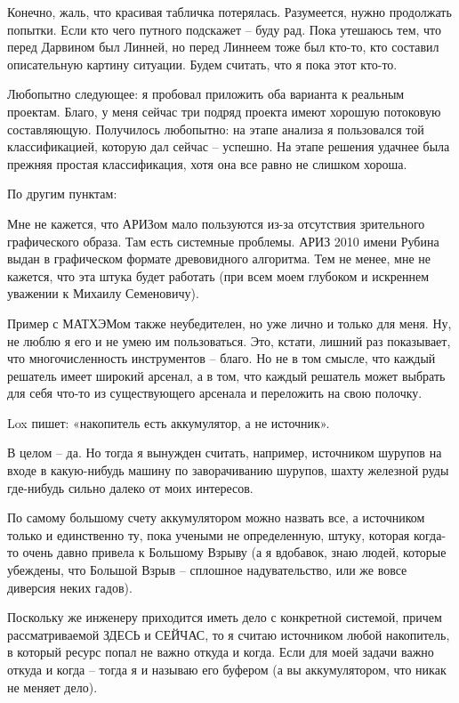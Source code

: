 \documentclass[a4paper,11pt]{article}
\begin{document}
Конечно, жаль, что красивая табличка потерялась. Разумеется, нужно продолжать
попытки. Если кто чего путного подскажет – буду рад. Пока утешаюсь тем, что
перед Дарвином был Линней, но перед Линнеем тоже был кто-то, кто составил
описательную картину ситуации. Будем считать, что я пока этот кто-то.

Любопытно следующее: я пробовал приложить оба варианта к реальным проектам.
Благо, у меня сейчас три подряд проекта имеют хорошую потоковую составляющую.
Получилось любопытно: на этапе анализа я пользовался той классификацией,
которую дал сейчас – успешно. На этапе решения удачнее была прежняя простая
классификация, хотя она все равно не слишком хороша.

По другим пунктам:

Мне не кажется, что АРИЗом мало пользуются из-за отсутствия зрительного
графического образа. Там есть системные проблемы. АРИЗ 2010 имени Рубина выдан
в графическом формате древовидного алгоритма. Тем не менее, мне не кажется,
что эта штука будет работать (при всем моем глубоком и искреннем уважении к
Михаилу Семеновичу).

Пример с МАТХЭМом также неубедителен, но уже лично и только для меня. Ну, не
люблю я его и не умею им пользоваться. Это, кстати, лишний раз показывает, что
многочисленность инструментов – благо. Но не в том смысле, что каждый решатель
имеет широкий арсенал, а в том, что каждый решатель может выбрать для себя
что-то из существующего арсенала и переложить на свою полочку.

Lox пишет: «накопитель есть аккумулятор, а не источник».

В целом – да. Но тогда я вынужден считать, например, источником шурупов на
входе в какую-нибудь машину по заворачиванию шурупов, шахту железной руды
где-нибудь сильно далеко от моих интересов.

По самому большому счету аккумулятором можно назвать все, а источником только
и единственно ту, пока учеными не определенную, штуку, которая когда-то очень
давно привела к Большому Взрыву (а я вдобавок, знаю людей, которые убеждены,
что Большой Взрыв – сплошное надувательство, или же вовсе диверсия неких
гадов).

Поскольку же инженеру приходится иметь дело с конкретной системой, причем
рассматриваемой ЗДЕСЬ и СЕЙЧАС, то я считаю источником любой накопитель, в
который ресурс попал не важно откуда и когда. Если для моей задачи важно
откуда и когда – тогда я и называю его буфером (а вы аккумулятором, что никак
не меняет дело).
\end{document}
